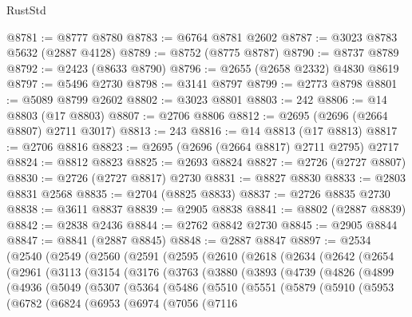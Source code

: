 \begin{lexlean}{RustStd}
\begin{coremodule}
@8781 := @8777 @8780
@8783 := @6764 @8781 @2602
@8787 := @3023 @8783 @5632 (@2887 @4128)
@8789 := @8752 (@8775 @8787)
@8790 := @8737 @8789
@8792 := @2423 (@8633 @8790)
@8796 := @2655 (@2658 @2332) @4830 @8619
@8797 := @5496 @2730
@8798 := @3141 @8797
@8799 := @2773 @8798
@8801 := @5089 @8799 @2602
@8802 := @3023 @8801
@8803 := 242
@8806 := @14 @8803 (@17 @8803)
@8807 := @2706 @8806
@8812 := @2695 (@2696 (@2664 @8807) @2711 @3017)
@8813 := 243
@8816 := @14 @8813 (@17 @8813)
@8817 := @2706 @8816
@8823 := @2695 (@2696 (@2664 @8817) @2711 @2795) @2717
@8824 := @8812 @8823
@8825 := @2693 @8824
@8827 := @2726 (@2727 @8807)
@8830 := @2726 (@2727 @8817) @2730
@8831 := @8827 @8830
@8833 := @2803 @8831 @2568
@8835 := @2704 (@8825 @8833)
@8837 := @2726 @8835 @2730
@8838 := @3611 @8837
@8839 := @2905 @8838
@8841 := @8802 (@2887 @8839)
@8842 := @2838 @2436
@8844 := @2762 @8842 @2730
@8845 := @2905 @8844
@8847 := @8841 (@2887 @8845)
@8848 := @2887 @8847
@8897 := @2534
    (@2540
      (@2549
        (@2560
          (@2591
            (@2595
              (@2610
                (@2618
                  (@2634
                    (@2642
                      (@2654
                        (@2961
                          (@3113
                            (@3154
                              (@3176
                                (@3763
                                  (@3880
                                    (@3893
                                      (@4739
                                        (@4826
                                          (@4899
                                            (@4936
                                              (@5049
                                                (@5307
                                                  (@5364
                                                    (@5486
                                                      (@5510
                                                        (@5551
                                                          (@5879
                                                            (@5910
                                                              (@5953
                                                                (@6782
                                                                  (@6824
                                                                    (@6953
                                                                      (@6974
                                                                        (@7056
                                                                          (@7116

\end{coremodule}
\end{lexlean}
